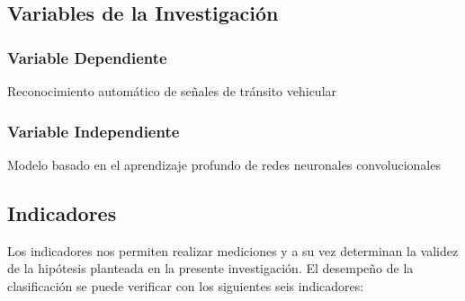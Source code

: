 \subsection{Variables de la Investigación}
		
		\subsubsection{Variable Dependiente}
		\indent Reconocimiento automático de señales de tránsito vehicular
		\subsubsection {Variable Independiente}
		\indent Modelo basado en el aprendizaje profundo de redes neuronales convolucionales	
		
\subsection{Indicadores}
		\renewcommand{\baselinestretch}{2}
		Los indicadores nos permiten realizar mediciones y a su vez determinan la validez de la hipótesis planteada en la presente investigación. El desempeño de la clasificación se puede verificar con los siguientes seis indicadores: 
